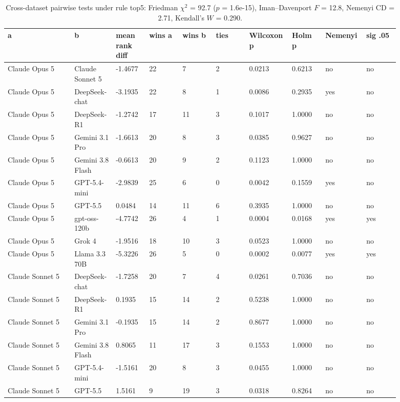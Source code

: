 \begin{landscape}
\tiny
\setlength{\tabcolsep}{3pt}
\begin{longtable}{p{0.162\linewidth}p{0.081\linewidth}p{0.081\linewidth}p{0.081\linewidth}p{0.081\linewidth}p{0.081\linewidth}p{0.081\linewidth}p{0.081\linewidth}p{0.081\linewidth}p{0.081\linewidth}}
\caption{Cross-dataset pairwise tests under rule top5: Friedman $\chi^2$ = 92.7 ($p$ = 1.6e-15), Iman--Davenport $F$ = 12.8, Nemenyi CD = 2.71, Kendall's $W$ = 0.290.}\label{tab:pairwise_top5}\\
\toprule
a & b & mean rank diff & wins a & wins b & ties & Wilcoxon p & Holm p & Nemenyi & sig .05 \\
\midrule
Claude Opus 5 & Claude Sonnet 5 & -1.4677 & 22 & 7 & 2 & 0.0213 & 0.6213 & no & no \\
Claude Opus 5 & DeepSeek-chat & -3.1935 & 22 & 8 & 1 & 0.0086 & 0.2935 & yes & no \\
Claude Opus 5 & DeepSeek-R1 & -1.2742 & 17 & 11 & 3 & 0.1017 & 1.0000 & no & no \\
Claude Opus 5 & Gemini 3.1 Pro & -1.6613 & 20 & 8 & 3 & 0.0385 & 0.9627 & no & no \\
Claude Opus 5 & Gemini 3.8 Flash & -0.6613 & 20 & 9 & 2 & 0.1123 & 1.0000 & no & no \\
Claude Opus 5 & GPT-5.4-mini & -2.9839 & 25 & 6 & 0 & 0.0042 & 0.1559 & yes & no \\
Claude Opus 5 & GPT-5.5 & 0.0484 & 14 & 11 & 6 & 0.3935 & 1.0000 & no & no \\
Claude Opus 5 & gpt-oss-120b & -4.7742 & 26 & 4 & 1 & 0.0004 & 0.0168 & yes & yes \\
Claude Opus 5 & Grok 4 & -1.9516 & 18 & 10 & 3 & 0.0523 & 1.0000 & no & no \\
Claude Opus 5 & Llama 3.3 70B & -5.3226 & 26 & 5 & 0 & 0.0002 & 0.0077 & yes & yes \\
Claude Sonnet 5 & DeepSeek-chat & -1.7258 & 20 & 7 & 4 & 0.0261 & 0.7036 & no & no \\
Claude Sonnet 5 & DeepSeek-R1 & 0.1935 & 15 & 14 & 2 & 0.5238 & 1.0000 & no & no \\
Claude Sonnet 5 & Gemini 3.1 Pro & -0.1935 & 15 & 14 & 2 & 0.8677 & 1.0000 & no & no \\
Claude Sonnet 5 & Gemini 3.8 Flash & 0.8065 & 11 & 17 & 3 & 0.1553 & 1.0000 & no & no \\
Claude Sonnet 5 & GPT-5.4-mini & -1.5161 & 20 & 8 & 3 & 0.0455 & 1.0000 & no & no \\
Claude Sonnet 5 & GPT-5.5 & 1.5161 & 9 & 19 & 3 & 0.0318 & 0.8264 & no & no \\

\end{longtable}
\end{landscape}

